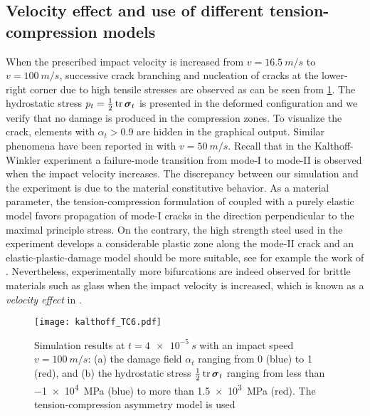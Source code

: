 \subsection{Velocity effect and use of different tension-compression models}
When the prescribed impact velocity is increased from $v=\SI{16.5}{m/s}$ to $v=\SI{100}{m/s}$, successive crack branching and nucleation of cracks at the lower-right corner due to high tensile stresses are observed as can be seen from \cref{fig:v1d5}. The hydrostatic stress $p_t=\frac{1}{2}\tr\sig_t$ is presented in the deformed configuration and we verify that no damage is produced in the compression zones. To visualize the crack, elements with $\alpha_t>0.9$ are hidden in the graphical output. Similar phenomena have been reported in \cite{HofackerMiehe:2012} with $v=\SI{50}{m/s}$. Recall that in the Kalthoff-Winkler experiment a failure-mode transition from mode-\RN{1} to mode-\RN{2} is observed when the impact velocity increases. The discrepancy between our simulation and the experiment is due to the material constitutive behavior. As a material parameter, the tension-compression formulation of \cite{FreddiRoyer-Carfagni:2010} coupled with a purely elastic model favors propagation of mode-\RN{1} cracks in the direction perpendicular to the maximal principle stress. On the contrary, the high strength steel used in the experiment develops a considerable plastic zone along the mode-\RN{2} crack and an elastic-plastic-damage model should be more suitable, see for example the work of \cite{MieheHofackerSchaenzelAldakheel:2015}. Nevertheless, experimentally more bifurcations are indeed observed for brittle materials such as glass when the impact velocity is increased, which is known as a \emph{velocity effect} in \cite{Schardin:2012}.
\begin{figure}[htbp]
\centering
\texttt{[image: kalthoff\_TC6.pdf]}
\caption{Simulation results at $t=\SI{4e-5}{s}$ with an impact speed $v=\SI{100}{m/s}$: (a) the damage field $\alpha_t$ ranging from 0 (blue) to 1 (red), and (b) the hydrostatic stress $\frac{1}{2}\tr\sig_t$ ranging from less than \SI{-1e4}{MPa} (blue) to more than \SI{1.5e3}{MPa} (red). The tension-compression asymmetry model \cite{FreddiRoyer-Carfagni:2010} is used} \label{fig:v1d5}
\end{figure}

